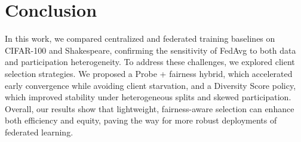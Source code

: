 \documentclass[10pt,twocolumn,letterpaper]{article}
\begin{document}
\section{Conclusion}
In this work, we compared centralized and federated training baselines on CIFAR-100 and Shakespeare, confirming the sensitivity of FedAvg to both data and participation heterogeneity. To address these challenges, we explored client selection strategies. We proposed a Probe + fairness hybrid, which accelerated early convergence while avoiding client starvation, and a Diversity Score policy, which improved stability under heterogeneous splits and skewed participation. Overall, our results show that lightweight, fairness-aware selection can enhance both efficiency and equity, paving the way for more robust deployments of federated learning.














{\footnotesize
\setlength{\itemsep}{0pt}


}
\end{document}
